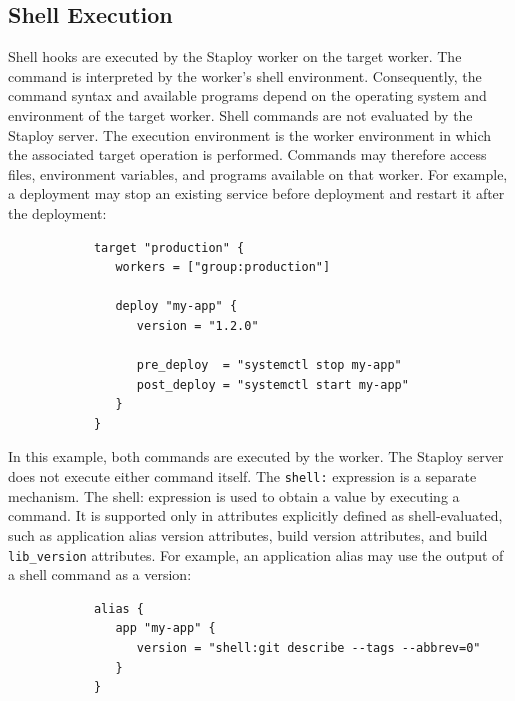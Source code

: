 \documentclass[11pt,a4paper]{article}
\begin{document}
    \subsection{Shell Execution}\label{subsec:shell-execution}

    Shell hooks are executed by the Staploy worker on the target worker.
    The command is interpreted by the worker's shell environment.
    Consequently, the command syntax and available programs depend on the operating system and environment of the target worker.
    Shell commands are not evaluated by the Staploy server.
    The execution environment is the worker environment in which the associated target operation is performed.
    Commands may therefore access files, environment variables, and programs available on that worker.
    For example, a deployment may stop an existing service before deployment and restart it after the deployment:

    \begin{center}
        \begin{verbatim}
            target "production" {
               workers = ["group:production"]

               deploy "my-app" {
                  version = "1.2.0"

                  pre_deploy  = "systemctl stop my-app"
                  post_deploy = "systemctl start my-app"
               }
            }
        \end{verbatim}
    \end{center}

    In this example, both commands are executed by the worker.
    The Staploy server does not execute either command itself.
    The \texttt{shell:} expression is a separate mechanism.
    The shell: expression is used to obtain a value by executing a command.
    It is supported only in attributes explicitly defined as shell-evaluated, such as application alias version attributes,
    build version attributes, and build \texttt{lib\_version} attributes.
    For example, an application alias may use the output of a shell command as a version:

    \begin{center}
        \begin{verbatim}
            alias {
               app "my-app" {
                  version = "shell:git describe --tags --abbrev=0"
               }
            }
        \end{verbatim}
    \end{center}
\end{document}
